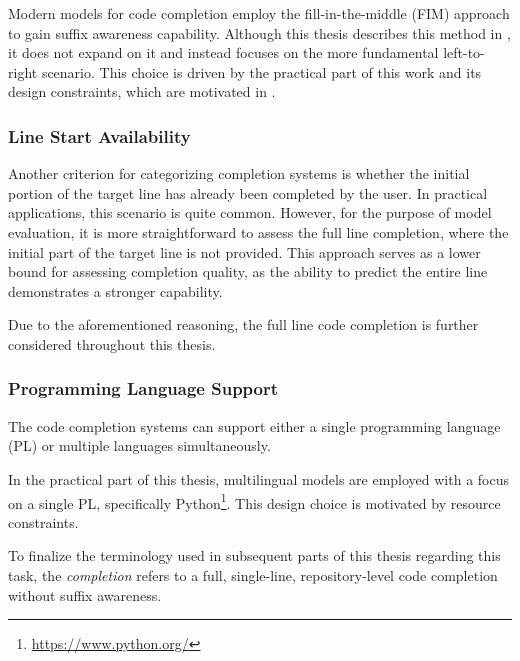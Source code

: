 Modern models for code completion employ the fill-in-the-middle (FIM) approach to gain suffix awareness capability. Although this thesis describes this method in , it does not expand on it and instead focuses on the more fundamental left-to-right scenario. This choice is driven by the practical part of this work and its design constraints, which are motivated in .

\subsubsection*{Line Start Availability}

Another criterion for categorizing completion systems is whether the initial portion of the target line has already been completed by the user. In practical applications, this scenario is quite common. However, for the purpose of model evaluation, it is more straightforward to assess the full line completion, where the initial part of the target line is not provided. This approach serves as a lower bound for assessing completion quality, as the ability to predict the entire line demonstrates a stronger capability.

Due to the aforementioned reasoning, the full line code completion is further considered throughout this thesis.

\subsubsection*{Programming Language Support}

The code completion systems can support either a single programming language (PL) or multiple languages simultaneously.

In the practical part of this thesis, multilingual models are employed with a focus on a single PL, specifically Python\footnote{\url{https://www.python.org/}}. This design choice is motivated by resource constraints.
\medskip

To finalize the terminology used in subsequent parts of this thesis regarding this task, the \textit{completion} refers to a full, single-line, repository-level code completion without suffix awareness.
